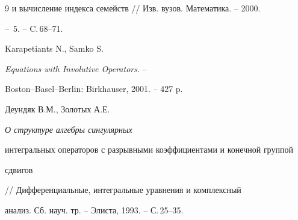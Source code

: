 \begin{thebibliography}{9}
{и вычисление индекса семейств} // Изв. вузов. Математика. -- 2000.


-- \No\,5. -- C.\,68--71.




Karapetiants N., Samko S.


{\em Equations with Involutive Operators}. --


Boston--Basel--Berlin: Birkhauser, 2001. -- 427 p.




Деундяк В.М., Золотых А.Е. {\em О структуре алгебры сингулярных


интегральных операторов с разрывными коэффициентами и конечной группой


сдвигов} // Дифференциальные, интегральные уравнения и комплексный


анализ. Сб. науч. тр. -- Элиста, 1993. -- С.\,25--35.





\end{thebibliography}





\vskip 2cm












\label{end}





